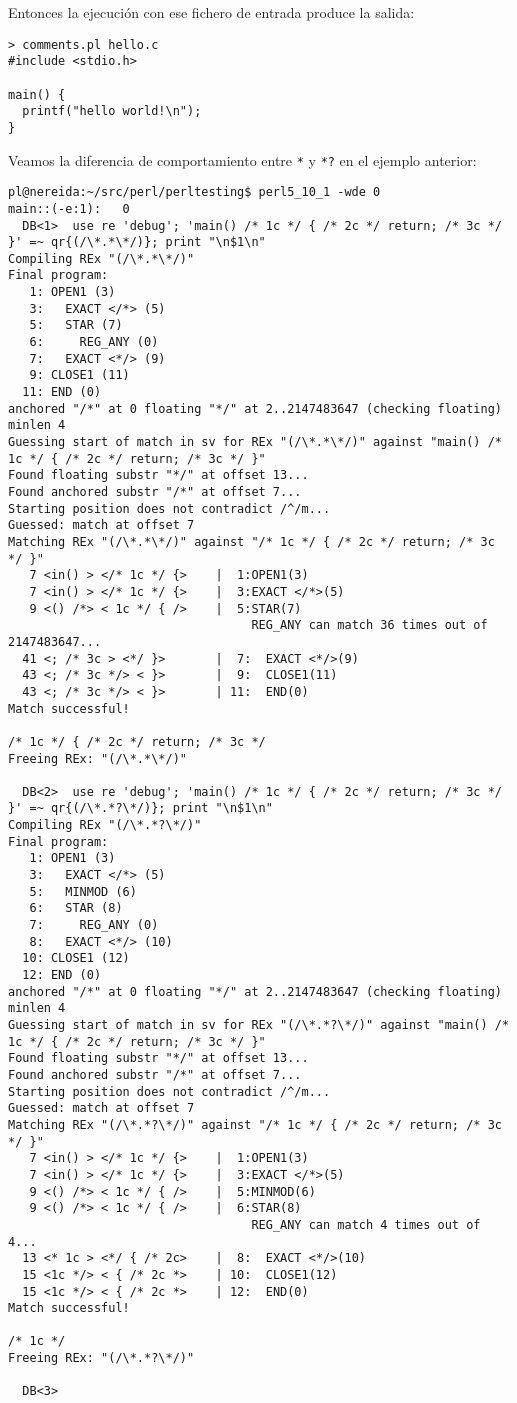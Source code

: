 Entonces la ejecución con ese fichero de entrada produce
la salida:
\begin{verbatim}
> comments.pl hello.c
#include <stdio.h>
 
main() {
  printf("hello world!\n");
}
\end{verbatim}
Veamos la diferencia de comportamiento entre \verb|*| y \verb|*?|
en el ejemplo anterior:

\begin{latexonly}
\begin{verbatim}
pl@nereida:~/src/perl/perltesting$ perl5_10_1 -wde 0
main::(-e:1):   0
  DB<1>  use re 'debug'; 'main() /* 1c */ { /* 2c */ return; /* 3c */ }' =~ qr{(/\*.*\*/)}; print "\n$1\n"
Compiling REx "(/\*.*\*/)"
Final program:
   1: OPEN1 (3)
   3:   EXACT </*> (5)
   5:   STAR (7)
   6:     REG_ANY (0)
   7:   EXACT <*/> (9)
   9: CLOSE1 (11)
  11: END (0)
anchored "/*" at 0 floating "*/" at 2..2147483647 (checking floating) minlen 4
Guessing start of match in sv for REx "(/\*.*\*/)" against "main() /* 1c */ { /* 2c */ return; /* 3c */ }"
Found floating substr "*/" at offset 13...
Found anchored substr "/*" at offset 7...
Starting position does not contradict /^/m...
Guessed: match at offset 7
Matching REx "(/\*.*\*/)" against "/* 1c */ { /* 2c */ return; /* 3c */ }"
   7 <in() > </* 1c */ {>    |  1:OPEN1(3)
   7 <in() > </* 1c */ {>    |  3:EXACT </*>(5)
   9 <() /*> < 1c */ { />    |  5:STAR(7)
                                  REG_ANY can match 36 times out of 2147483647...
  41 <; /* 3c > <*/ }>       |  7:  EXACT <*/>(9)
  43 <; /* 3c */> < }>       |  9:  CLOSE1(11)
  43 <; /* 3c */> < }>       | 11:  END(0)
Match successful!

/* 1c */ { /* 2c */ return; /* 3c */
Freeing REx: "(/\*.*\*/)"

  DB<2>  use re 'debug'; 'main() /* 1c */ { /* 2c */ return; /* 3c */ }' =~ qr{(/\*.*?\*/)}; print "\n$1\n"
Compiling REx "(/\*.*?\*/)"
Final program:
   1: OPEN1 (3)
   3:   EXACT </*> (5)
   5:   MINMOD (6)
   6:   STAR (8)
   7:     REG_ANY (0)
   8:   EXACT <*/> (10)
  10: CLOSE1 (12)
  12: END (0)
anchored "/*" at 0 floating "*/" at 2..2147483647 (checking floating) minlen 4
Guessing start of match in sv for REx "(/\*.*?\*/)" against "main() /* 1c */ { /* 2c */ return; /* 3c */ }"
Found floating substr "*/" at offset 13...
Found anchored substr "/*" at offset 7...
Starting position does not contradict /^/m...
Guessed: match at offset 7
Matching REx "(/\*.*?\*/)" against "/* 1c */ { /* 2c */ return; /* 3c */ }"
   7 <in() > </* 1c */ {>    |  1:OPEN1(3)
   7 <in() > </* 1c */ {>    |  3:EXACT </*>(5)
   9 <() /*> < 1c */ { />    |  5:MINMOD(6)
   9 <() /*> < 1c */ { />    |  6:STAR(8)
                                  REG_ANY can match 4 times out of 4...
  13 <* 1c > <*/ { /* 2c>    |  8:  EXACT <*/>(10)
  15 <1c */> < { /* 2c *>    | 10:  CLOSE1(12)
  15 <1c */> < { /* 2c *>    | 12:  END(0)
Match successful!

/* 1c */
Freeing REx: "(/\*.*?\*/)"

  DB<3>
\end{verbatim}
\end{latexonly}
